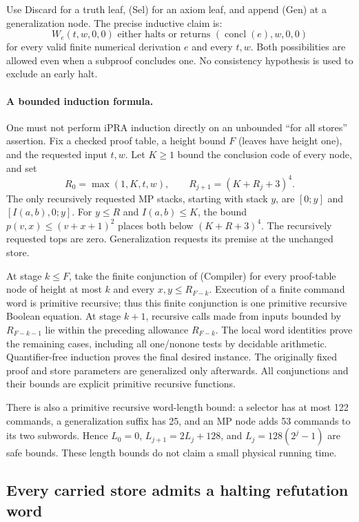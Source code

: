 Use Discard for a truth leaf, (Sel) for an axiom leaf, and append (Gen)
at a generalization node.  The precise inductive claim is:
\[
 W_e(t,w,0,0)\text{ either halts or returns }
       (\operatorname{concl}(e),w,0,0)                  \tag{Compiler}
\]
for every valid finite numerical derivation $e$ and every $t,w$.
Both possibilities are allowed even when a subproof concludes one.
No consistency hypothesis is used to exclude an early halt.

\paragraph{A bounded induction formula.}
One must not perform iPRA induction directly on an unbounded
``for all stores'' assertion.  Fix a checked proof table, a height bound
$F$ (leaves have height one), and the requested input $t,w$.
Let $K\ge1$ bound the conclusion code of every node, and set
\[
 R_0=\max(1,K,t,w),\qquad R_{j+1}=(K+R_j+3)^4.
\]
The only recursively requested MP stacks, starting with stack $y$, are
$[0;y]$ and $[I(a,b),0;y]$.  For $y\le R$ and $I(a,b)\le K$, the
bound $p(v,x)\le(v+x+1)^2$ places both below $(K+R+3)^4$.
The recursively requested tops are zero.  Generalization requests its
premise at the unchanged store.

At stage $k\le F$, take the finite conjunction of (Compiler) for every
proof-table node of height at most $k$ and every $x,y\le R_{F-k}$.
Execution of a finite command word is primitive recursive; thus this
finite conjunction is one primitive recursive Boolean equation.
At stage $k+1$, recursive calls made from inputs bounded by
$R_{F-k-1}$ lie within the preceding allowance $R_{F-k}$.
The local word identities prove the remaining cases, including all
one/nonone tests by decidable arithmetic.  Quantifier-free induction
proves the final desired instance.  The originally fixed proof and store
parameters are generalized only afterwards.  All conjunctions and their
bounds are explicit primitive recursive functions.

There is also a primitive recursive word-length bound: a selector has
at most 122 commands, a generalization suffix has 25, and an MP node
adds 53 commands to its two subwords.  Hence
$L_0=0$, $L_{j+1}=2L_j+128$, and $L_j=128(2^j-1)$ are safe bounds.
These length bounds do not claim a small physical running time.

\subsection{Every carried store admits a halting refutation word}


